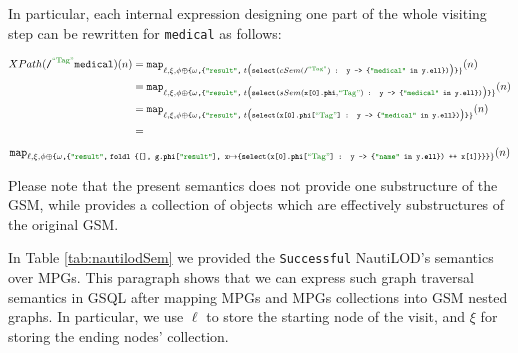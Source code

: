 \begin{example}
In particular, each internal expression designing one part of the whole visiting step can be rewritten for \texttt{medical} as follows:

\hspace*{-1.5cm}\vbox{\[\begin{split}
XPath(\texttt{/}^{\mstr{Tag}}\texttt{medical})(n)&=\texttt{map}_{\ell,\xi,\phi\oplus\texttt{\{}\omega\texttt{,\{\mstr{result},}\;t\big(\texttt{select(} cSem(\texttt{/}^{\mstr{Tag}}) \texttt{ : y -> \{\mstr{medical} in y.\textbf{ell}\})}\big)\texttt{\}}\}}(n)\\
	&=\texttt{map}_{\ell,\xi,\phi\oplus\texttt{\{}\omega\texttt{,\{\mstr{result},}\;t\big(\texttt{select(} sSem(\texttt{x[0].\textbf{phi}},\mstr{Tag}) \texttt{ : y -> \{\mstr{medical} in y.\textbf{ell}\})}\big)\texttt{\}}\}}(n)\\
	&=\texttt{map}_{\ell,\xi,\phi\oplus\texttt{\{}\omega\texttt{,\{\mstr{result},}\;t\big(\texttt{select(} \texttt{x[0].\textbf{phi}[}\mstr{Tag}\texttt{]} \texttt{ : y -> \{\mstr{medical} in y.\textbf{ell}\})}\big)\texttt{\}}\}}(n)\\
	&=\\
\end{split}\]
\[\texttt{map}_{\ell,\xi,\phi\oplus\texttt{\{}\omega\texttt{,\{\mstr{result},\;foldl \{[], g.\textbf{phi}[\mstr{result}], x}\mapsto\texttt{\{}\texttt{select(} \texttt{x[0].\textbf{phi}[}\mstr{Tag}\texttt{]} \texttt{ : y -> \{\mstr{name} in y.\textbf{ell}\})}\texttt{ ++ x[1]\}\}\}}\}}(n)\]}
\end{example}

Please note that the present semantics does not provide one substructure  of the GSM, while provides a collection of objects which are effectively substructures of the original GSM.

\label{ph:NTLImpl}
In Table \vref{tab:nautilodSem} we provided the \texttt{Successful} NautiLOD's semantics over MPGs. This paragraph shows that  we can express such graph traversal semantics in GSQL after mapping MPGs and MPGs collections into GSM nested graphs. In particular, we 
use $\ell$ to store the starting node of the visit, and $\xi$ for storing the ending nodes' collection.

